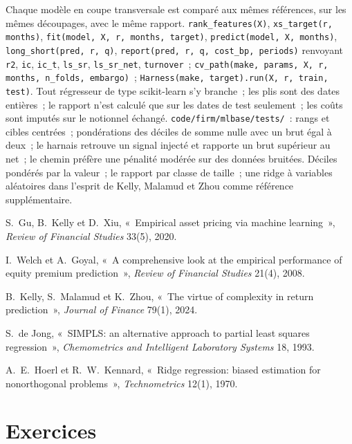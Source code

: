 \begin{build}
 Chaque modèle en coupe transversale est comparé aux mêmes références, sur les mêmes découpages, avec le même
rapport.
 \texttt{rank\_features(X)}, \texttt{xs\_target(r, months)},
\texttt{fit(model, X, r, months, target)}, \texttt{predict(model, X, months)}, \texttt{long\_short(pred, r, q)},
\texttt{report(pred, r, q, cost\_bp, periods)} renvoyant \texttt{r2}, \texttt{ic}, \texttt{ic\_t}, \texttt{ls\_sr}, \texttt{ls\_sr\_net},
\texttt{turnover}~; \texttt{cv\_path(make, params, X, r, months, n\_folds, embargo)}~;
\texttt{Harness(make, target).run(X, r, train, test)}.
 Tout régresseur de type scikit-learn s'y branche~; les plis sont des dates entières~; le rapport n'est calculé que sur les dates de test
seulement~; les coûts sont imputés sur le notionnel échangé.
 \texttt{code/firm/mlbase/tests/}~: rangs et cibles centrées~; pondérations des déciles de somme nulle
avec un brut égal à deux~; le harnais retrouve un signal injecté et rapporte un brut supérieur au net~; le chemin préfère une pénalité
modérée sur des données bruitées.
 Déciles pondérés par la valeur~; le rapport par classe de taille~; une ridge à variables aléatoires dans
l'esprit de Kelly, Malamud et Zhou comme référence supplémentaire.
\end{build}

\begin{omsources}
\item S.~Gu, B.~Kelly et D.~Xiu, «~Empirical asset pricing via machine learning~», \emph{Review of Financial Studies}
33(5), 2020.
\item I.~Welch et A.~Goyal, «~A comprehensive look at the empirical performance of equity premium prediction~»,
\emph{Review of Financial Studies} 21(4), 2008.
\item B.~Kelly, S.~Malamud et K.~Zhou, «~The virtue of complexity in return prediction~», \emph{Journal of Finance}
79(1), 2024.
\item S.~de Jong, «~SIMPLS: an alternative approach to partial least squares regression~», \emph{Chemometrics and
Intelligent Laboratory Systems} 18, 1993.
\item A.~E.~Hoerl et R.~W.~Kennard, «~Ridge regression: biased estimation for nonorthogonal problems~»,
\emph{Technometrics} 12(1), 1970.
\end{omsources}

\section{Exercices}

